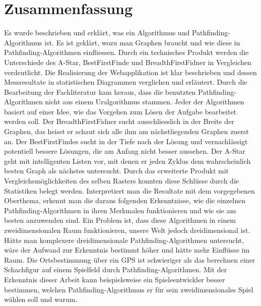 \section{Zusammenfassung}
Es wurde beschrieben und erklärt, was ein Algorithmus und Pathfinding-Algorithmus ist. Es ist geklärt, wozu man Graphen braucht und wie diese in Pathfinding-Algorithmen einfliessen. Durch ein technisches Produkt werden die Unterschiede des A-Star, BestFirstFinde und BreadthFirstFidner in Vergleichen verdeutlicht. Die Realisierung der Webapplikation ist klar beschrieben und dessen Messresultate in statistischen Diagrammen verglichen und erläutert. Durch die Bearbeitung der Fachliteratur kam heraus, dass die benutzten Pathfinding-Algorithmen nicht aus einem Uralgorithmus stammen. Jeder der Algorithmen basiert auf einer Idee, wie das Vorgehen zum Lösen der Aufgabe bearbeitet werden soll. Der BreadthFirstFidner sucht ausschliesslich in der Breite der Graphen, das heisst er schaut sich alle ihm am nächstliegenden Graphen zuerst an. Der BestFirstFindes sucht in der Tiefe nach der Lösung und vernachlässigt potentiell bessere Lösungen, die am Anfang nicht besser aussehen. Der A-Star geht mit intelligenten Listen vor, mit denen er jeden Zyklus dem wahrscheinlich besten Graph als nächstes untersucht. Durch das erweiterte Produkt mit Vergleichsmöglichkeiten des selben Rasters konnten diese Schlüsse durch die Statistiken belegt werden. Interpretiert man die Resultate mit dem vorgegebenen Oberthema, erkennt man die daraus folgenden Erkenntnisse, wie die einzelnen Pathfinding-Algorithmen in ihren Merkmalen funktionieren und wie sie am besten anzuwenden sind. Ein Problem ist, dass diese Algorithmen in einem zweidimensionalen Raum funktionieren, unsere Welt jedoch dreidimensional ist. Hätte man komplexere dreidimensionale Pathfinding-Algorithmen untersucht, wäre der Aufwand zur Erkenntnis bestimmt höher und hätte mehr Einflüsse im Raum. Die Ortsbestimmung über ein GPS ist schwieriger als das berechnen einer Schachfigur auf einem Spielfeld durch Pathfinding-Algorithmen. Mit der Erkenntnis dieser Arbeit kann beispielsweise ein Spieleentwickler besser bestimmen, welchen Pathfinding-Algorithmus er für sein zweidimensionales Spiel wählen soll und warum.
